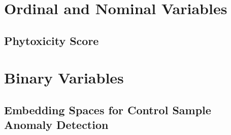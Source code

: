 \documentclass[12pt,a4paper,oneside]{report}
\begin{document}
\section{Ordinal and Nominal Variables}
\subsection{Phytoxicity Score}

\section{Binary Variables}
\subsection{Embedding Spaces for Control Sample Anomaly Detection}



\end{document}
